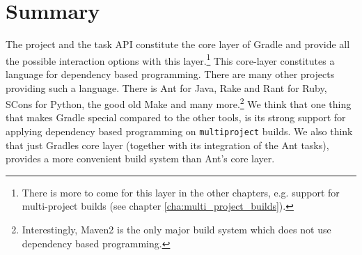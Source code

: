 \section{Summary} %
\label{sec:summary}
The project and the task API constitute the core layer of Gradle and provide all the possible interaction options with this layer.\footnote{There is more to come for this layer in the other chapters, e.g. support for multi-project builds (see chapter \ref{cha:multi_project_builds}).} This core-layer constitutes a language for dependency based programming. There are many other projects providing such a language. There is Ant for Java, Rake and Rant for Ruby, SCons for Python, the good old Make and many more.\footnote{Interestingly, Maven2 is the only major build system which does not use dependency based programming.} We think that one thing that makes Gradle special compared to the other tools, is its strong support for applying dependency based programming on \texttt{multiproject} builds. We also think that just Gradles core layer (together with its integration of the Ant tasks), provides a more convenient build system than Ant's core layer.

